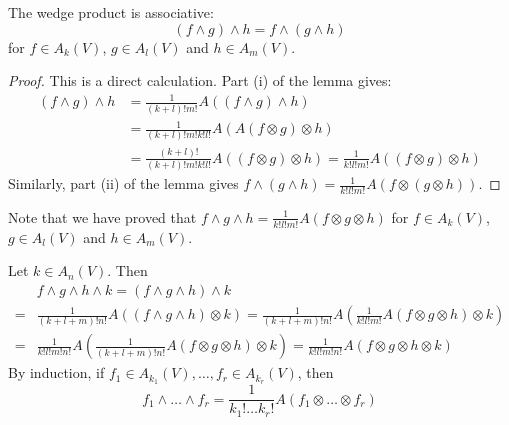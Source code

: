 \begin{frame}
  \begin{prop}
    The wedge product is associative:
    \begin{displaymath}
      (f \wedge g) \wedge h = f \wedge (g \wedge h)
    \end{displaymath}
    for $f \in A_k(V)$, $g \in A_l(V)$ and $h \in A_m(V)$.
  \end{prop}
  \begin{proof}
    This is a direct calculation. Part (i) of the lemma gives:
    \begin{align*}
      (f \wedge g) \wedge h &= \frac{1}{(k+l)!m!} A((f \wedge g) \wedge h) \\
      &=
      \frac{1}{(k+l)!m!k!l!} A(A(f \otimes g) \otimes h)
      \\
      &=
      \frac{(k+l)!}{(k+l)!m!k!l!} A((f \otimes g) \otimes h)
      =
      \frac{1}{k!l!m!} A((f \otimes g) \otimes h)
    \end{align*}
    Similarly, part (ii) of the lemma gives $f \wedge (g \wedge h) = 
    \frac{1}{k!l!m!} A(f \otimes (g \otimes h))$.
  \end{proof}
\end{frame}
\begin{frame}
  Note that we have proved that $f \wedge g \wedge h = \frac{1}{k!l!m!}
  A(f \otimes g \otimes h)$ for $f \in A_k(V)$, $g \in A_l(V)$ and $h \in
  A_m(V)$.

  Let $k \in A_n(V)$. Then
  \begin{align*}
    \phantom{=}&f \wedge g \wedge h \wedge k = (f \wedge g \wedge h) \wedge k \\
    =&
    \frac{1}{(k+l+m)!n!} A((f \wedge g \wedge h) \otimes k)
    = \frac{1}{(k+l+m)! n!} A(\frac{1}{k!l!m!} A(f \otimes g \otimes h) \otimes
    k) \\
    =& 
    \frac{1}{k!l!m!n!} A(\frac{1}{(k+l+m)!n!} A(f \otimes g \otimes h) \otimes k)
    =
    \frac{1}{k!l!m!n!} A(f \otimes g \otimes h \otimes k)
  \end{align*}
  By induction, if $f_1 \in A_{k_1}(V), \dots, f_r \in A_{k_r}(V)$, then
  \begin{displaymath}
    f_1 \wedge \dots \wedge f_r =
    \frac{1}{k_1! \dots k_r!}A(f_1 \otimes \dots \otimes f_r)
  \end{displaymath}
\end{frame}

